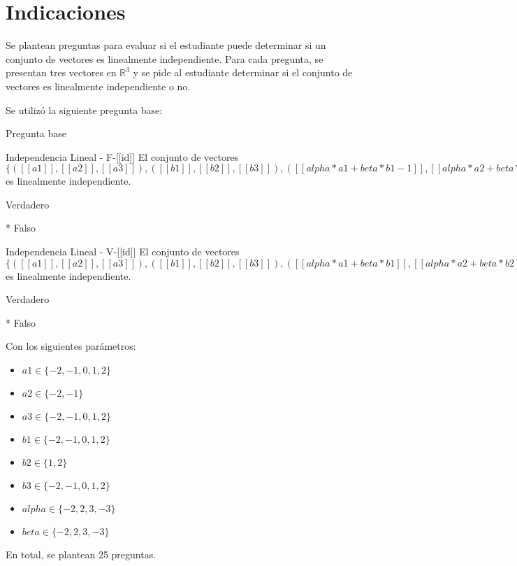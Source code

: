 \documentclass[a4,11pt]{aleph-notas}
\begin{document}
\encabezado

\vspace*{-8mm}
\section{Indicaciones}

Se plantean preguntas para evaluar si el estudiante puede determinar si un conjunto de vectores es linealmente independiente. Para cada pregunta, se presentan tres vectores en $\mathbb{R}^3$ y se pide al estudiante determinar si el conjunto de vectores es linealmente independiente o no.



Se utilizó la siguiente pregunta base:
\begin{quiz}{Pregunta base}

\begin{multi}[numbering = none, shuffle = false]%
    {Independencia Lineal - F-[[id]]}
    El conjunto de vectores $\{ ([[a1]],[[a2]],[[a3]]) , ([[b1]],[[b2]],[[b3]]), ([[alpha*a1+beta*b1-1]], [[alpha*a2+beta*b2+1]], [[alpha*a3+beta*b3]]) \}$ es linealmente independiente.
    \item[] Verdadero 
    \item[]* Falso
\end{multi}

\begin{multi}[numbering = none, shuffle = false]%
    {Independencia Lineal - V-[[id]]}
    El conjunto de vectores $\{ ([[a1]],[[a2]],[[a3]]) , ([[b1]],[[b2]],[[b3]]), ([[alpha*a1+beta*b1]], [[alpha*a2+beta*b2]], [[alpha*a3+beta*b3]]) \}$ es linealmente independiente.
    \item[] Verdadero 
    \item[]* Falso
\end{multi}

\end{quiz}
\noindent
Con los siguientes parámetros:
\begin{itemize}
	\item $a1 \in \{-2, -1, 0, 1, 2\}$
	\item $a2 \in \{-2, -1\}$
	\item $a3 \in \{-2, -1, 0, 1, 2\}$
	\item $b1 \in \{-2, -1, 0, 1, 2\}$
	\item $b2 \in \{1, 2\}$
	\item $b3 \in \{-2, -1, 0, 1, 2\}$
	\item $alpha \in \{-2, 2, 3, -3\}$
	\item $beta \in \{-2, 2, 3, -3\}$

\end{itemize}
En total, se plantean 25 preguntas.
\end{document}

